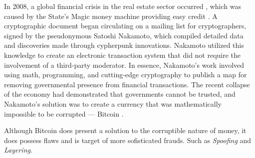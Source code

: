 In 2008, a global financial crisis in the real estate sector occurred \cite{bordo2008historical}, which was caused by
the State's Magic money machine providing easy credit \cite{murphy2008analysis}. A cryptographic document began
circulating on a mailing list for cryptographers, signed by the pseudonymous Satoshi Nakamoto, which compiled detailed
data and discoveries made through cypherpunk innovations. Nakamoto utilized this knowledge to create an electronic
transaction system that did not require the involvement of a third-party moderator. In essence, Nakamoto's work involved
using math, programming, and cutting-edge cryptography to publish a map for removing governmental presence from
financial transactions. The recent collapse of the economy had demonstrated that governments cannot be trusted, and
Nakamoto's solution was to create a currency that was mathematically impossible to be corrupted --- Bitcoin \cite{nakamoto2008bitcoin}.

Although Bitcoin does present a solution to the corruptible nature of money, it does possess flaws and is target of more
sofisticated frauds. Such as \textit{Spoofing} and \textit{Layering}.